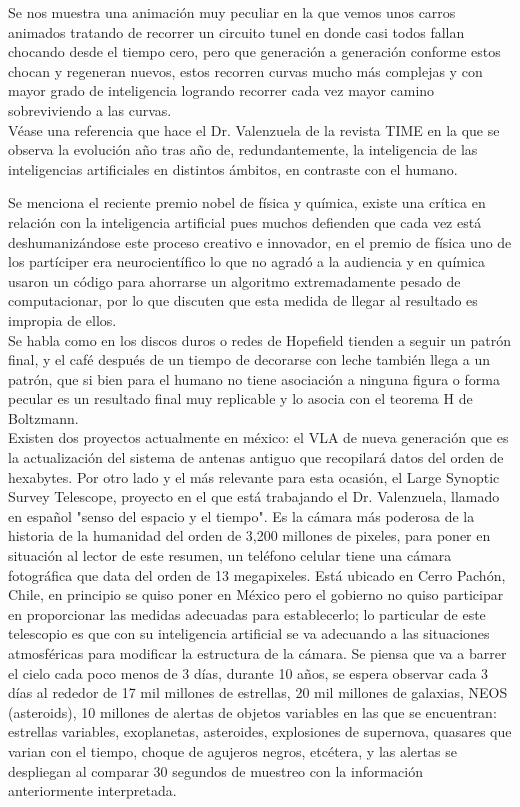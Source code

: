 \documentclass{article}
\begin{document}
Se nos muestra una animación muy peculiar en la que vemos unos carros animados tratando de recorrer un circuito tunel en donde casi todos fallan chocando desde el tiempo cero, pero que generación a generación conforme estos chocan y regeneran nuevos, estos recorren curvas mucho más complejas y con mayor grado de inteligencia logrando recorrer cada vez mayor camino sobreviviendo a las curvas.\\
Véase una referencia que hace el Dr. Valenzuela de la revista TIME en la que se observa la evolución año tras año de, redundantemente, la inteligencia de las inteligencias artificiales en distintos ámbitos, en contraste con el humano.

Se menciona el reciente premio nobel de física y química, existe una crítica en relación con la inteligencia artificial pues muchos defienden que cada vez está deshumanizándose este proceso creativo e innovador, en el premio de física uno de los partíciper era neurocientífico lo que no agradó a la audiencia y en química usaron un código para ahorrarse un algoritmo extremadamente pesado de computacionar, por lo que discuten que esta medida de llegar al resultado es impropia de ellos.\\
Se habla como en los discos duros o redes de Hopefield tienden a seguir un patrón final, y el café después de un tiempo de decorarse con leche también llega a un patrón, que si bien para el humano no tiene asociación a ninguna figura o forma pecular es un resultado final muy replicable y lo asocia con el teorema H de Boltzmann.\\

Existen dos proyectos actualmente en méxico: el VLA de nueva generación que es la actualización del sistema de antenas antiguo que recopilará datos del orden de hexabytes. Por otro lado y el más relevante para esta ocasión, el Large Synoptic Survey Telescope, proyecto en el que está trabajando el Dr. Valenzuela, llamado en español "senso del espacio y el tiempo".
Es la cámara más poderosa de la historia de la humanidad del orden de 3,200 millones de pixeles, para poner en situación al lector de este resumen, un teléfono celular tiene una cámara fotográfica que data del orden de 13 megapixeles. Está ubicado en Cerro Pachón, Chile, en principio se quiso poner en México pero el gobierno no quiso participar en proporcionar las medidas adecuadas para establecerlo; lo particular de este telescopio es que con su inteligencia artificial se va adecuando a las situaciones atmosféricas para modificar la estructura de la cámara. 
Se piensa que va a barrer el cielo cada poco menos de 3 días, durante 10 años, se espera observar cada 3 días al rededor de 17 mil millones de estrellas, 20 mil millones de galaxias, NEOS (asteroids), 10 millones de alertas de objetos variables en las que se encuentran: estrellas variables, exoplanetas, asteroides, explosiones de supernova, quasares que varian con el tiempo, choque de agujeros negros, etcétera, y las alertas se despliegan al comparar 30 segundos de muestreo con la información anteriormente interpretada.
\end{document}
